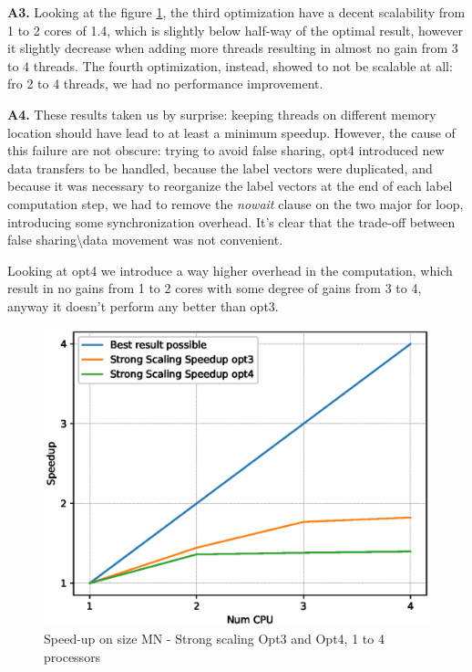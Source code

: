 \documentclass[conference]{IEEEtran}
\newcommand{\mypar}[1]{{\bf #1.}}
\begin{document}
\mypar{A3}
Looking at the figure \ref{fig:speedup}, the third optimization have a decent scalability from 1 to 2 cores of 1.4, which is slightly below half-way of the optimal result, however it slightly decrease when adding more threads resulting in almost no gain from 3 to 4 threads.
The fourth optimization, instead, showed to not be scalable at all: fro 2 to 4 threads, we had no performance improvement.

\mypar{A4}
These results taken us by surprise: keeping threads on different memory location should have lead to at least a minimum speedup. However, the cause of this failure are not obscure: trying to avoid false sharing, opt4 introduced new data transfers to be handled, because the label vectors were duplicated, and because it was necessary to reorganize the label vectors at the end of each label computation step, we had to remove the \textit{nowait} clause on the two major for loop, introducing some synchronization overhead. It's clear that the trade-off between false sharing\textbackslash data movement was not convenient.

Looking at opt4 we introduce a way higher overhead in the computation, which result in no gains from 1 to 2 cores with some degree of gains from 3 to 4, anyway it doesn't perform any better than opt3.

\begin{figure}[h!]
    \includegraphics[scale=0.55]{img/speedUP.eps}
    \vspace*{-8mm}
    \caption{Speed-up on size MN - Strong scaling Opt3 and Opt4, 1 to 4 processors}
    \label{fig:speedup}
\end{figure}
\end{document}
